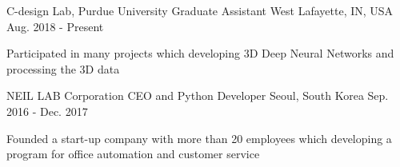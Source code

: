 


\begin{cventries}

\cventry
{C-design Lab, Purdue University} %
{Graduate Assistant} %
{West Lafayette, IN, USA} %
{Aug. 2018 - Present} %
{ %
\begin{cvitems}
\item {Participated in many projects which developing 3D Deep Neural Networks and processing the 3D data}
\end{cvitems}
}

\cventry
{NEIL LAB Corporation} %
{CEO and Python Developer} %
{Seoul, South Korea} %
{Sep. 2016 - Dec. 2017} %
{ %
\begin{cvitems}
\item {Founded a start-up company with more than 20 employees which developing a program for office automation and customer service}
\end{cvitems}
}

\end{cventries}